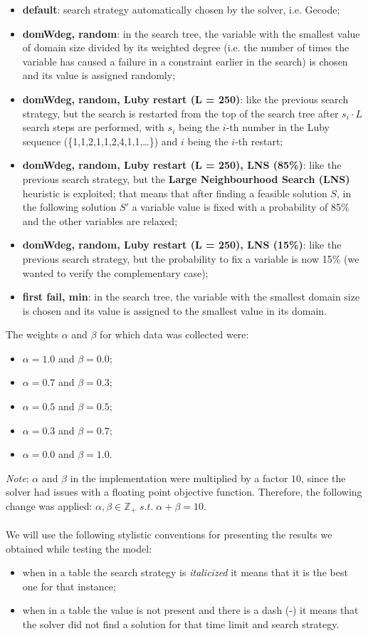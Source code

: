 \documentclass[../main.tex]{subfiles}
\begin{document}
\begin{itemize}
    \item \textbf{default}: search strategy automatically chosen by the solver, i.e. Gecode;
    \item \textbf{domWdeg, random}: in the search tree, the variable with the smallest value of domain size divided by its weighted degree (i.e. the number of times the variable has caused a failure in a constraint earlier in the search) is chosen and its value is assigned randomly;
    \item \textbf{domWdeg, random, Luby restart (L = 250)}: like the previous search strategy, but the search is restarted from the top of the search tree after $s_i \cdot L$ search steps are performed, with $s_i$ being the $i$-th number in the Luby sequence (\{1,1,2,1,1,2,4,1,1,\dots\}) and $i$ being the $i$-th restart;
    \item \textbf{domWdeg, random, Luby restart (L = 250), LNS (85\%)}: like the previous search strategy, but the \textbf{Large Neighbourhood Search (LNS)} heuristic is exploited; that means that after finding a feasible solution $S$, in the following solution $S'$ a variable value is fixed with a probability of 85\% and the other variables are relaxed;
    \item \textbf{domWdeg, random, Luby restart (L = 250), LNS (15\%)}: like the previous search strategy, but the probability to fix a variable is now 15\% (we wanted to verify the complementary case);
    \item \textbf{first fail, min}: in the search tree, the variable with the smallest domain size is chosen and its value is assigned to the smallest value in its domain.
\end{itemize}
The weights $\alpha$ and $\beta$ for which data was collected were:
\begin{itemize}
    \item $\alpha = 1.0$ and $\beta = 0.0$;
    \item $\alpha = 0.7$ and $\beta = 0.3$;
    \item $\alpha = 0.5$ and $\beta = 0.5$;
    \item $\alpha = 0.3$ and $\beta = 0.7$;
    \item $\alpha = 0.0$ and $\beta = 1.0$.
\end{itemize}
\textit{Note}: $\alpha$ and $\beta$ in the implementation were multiplied by a factor $10$, since the solver had issues with a floating point objective function. Therefore, the following change was applied: $\alpha, \beta \in \mathbb{Z}_+ \; s.t.\; \alpha + \beta = 10$.
\\
\\
 We will use the following stylistic conventions for presenting the results we obtained while testing the model:
\begin{itemize}
    \item when in a table the search strategy is \textit{italicized} it means that it is the best one for that instance;
    \item when in a table the value is not present and there is a dash (-) it means that the solver did not find a solution for that time limit and search strategy.
\end{itemize}
\newpage
\end{document}
